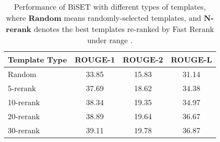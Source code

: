 \documentclass[11pt,a4paper]{article}
\begin{document}
\begin{spacing}{1.0}
\begin{table}[h]
\small
	\centering
{}
	\caption{Performance of all the models, where results marked with  are taken from the corresponding papers.}
\label{tab:Rewrite}
\end{table}

\begin{table}[h]
\small
	
	\centering
	\begin{tabular}{@{}l|ccc@{}}
		\toprule
        Template Type & ROUGE-1   & ROUGE-2  & ROUGE-L  \\
        \hline
        Random  & 33.85 & 15.83 & 31.14 \\
        5-rerank  & 37.69 & 18.62 & 34.38 \\
        10-rerank   & 38.34 & 19.35 & 34.97 \\
        20-rerank   & 38.89 & 19.64 & 36.67 \\
        30-rerank   & 39.11 & 19.78 & 36.87 \\

        \bottomrule
	\end{tabular}
	\caption{Performance of BiSET with different types of templates, where \textbf{Random} means randomly-selected templates, and \textbf{N-rerank} denotes the best templates re-ranked by Fast Rerank under range .}
\label{tab:Roubustness}
\end{table}


\end{spacing}
\end{document}
